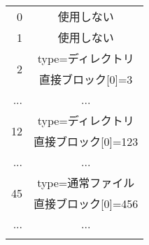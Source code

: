 \documentclass[border=1mm]{standalone}
\begin{document}
\ttfamily\footnotesize\begin{tabular}{r |c |}\cline{2-2}
\multirow{2}{*}{0}   & \multirow{2}{*}{使用しない} \\
                     &                             \\\cline{2-2}
\multirow{2}{*}{1}   & \multirow{2}{*}{使用しない} \\
                     &                             \\\cline{2-2}
\multirow{2}{*}{2}   & type=ディレクトリ           \\
                     & 直接ブロック[0]=3           \\\cline{2-2}
\multirow{2}{*}{...} & \multirow{2}{*}{...}        \\
                     &                             \\\cline{2-2}
\multirow{2}{*}{12}  & type=ディレクトリ           \\
                     & 直接ブロック[0]=123         \\\cline{2-2}
\multirow{2}{*}{...} & \multirow{2}{*}{...}        \\
                     &                             \\\cline{2-2}
\multirow{2}{*}{45}  & type=通常ファイル           \\
                     & 直接ブロック[0]=456         \\\cline{2-2}
\multirow{2}{*}{...} & \multirow{2}{*}{...}        \\
                     &                             \\
\multicolumn{2}{c}{}\\
\end{tabular}~
\end{document}
